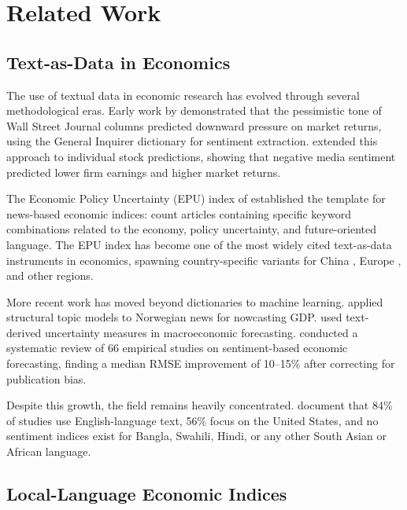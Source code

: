 
\section{Related Work}\label{sec:related}

\subsection{Text-as-Data in Economics}

The use of textual data in economic research has evolved through several methodological eras. Early work by \citet{tetlock2007giving} demonstrated that the pessimistic tone of Wall Street Journal columns predicted downward pressure on market returns, using the General Inquirer dictionary for sentiment extraction. \citet{tetlock2007sad} extended this approach to individual stock predictions, showing that negative media sentiment predicted lower firm earnings and higher market returns.

The Economic Policy Uncertainty (EPU) index of \citet{bakereconomic} established the template for news-based economic indices: count articles containing specific keyword combinations related to the economy, policy uncertainty, and future-oriented language. The EPU index has become one of the most widely cited text-as-data instruments in economics, spawning country-specific variants for China \citep{huang2018measuring}, Europe \citep{ferrara2022uncertainty}, and other regions.

More recent work has moved beyond dictionaries to machine learning. \citet{thorsrud2018text} applied structural topic models to Norwegian news for nowcasting GDP. \citet{jurado2015macroeconomic} used text-derived uncertainty measures in macroeconomic forecasting. \citet{nabil2026economic} conducted a systematic review of 66 empirical studies on sentiment-based economic forecasting, finding a median RMSE improvement of 10--15\% after correcting for publication bias.

Despite this growth, the field remains heavily concentrated. \citet{nabil2026economic} document that 84\% of studies use English-language text, 56\% focus on the United States, and no sentiment indices exist for Bangla, Swahili, Hindi, or any other South Asian or African language.

\subsection{Local-Language Economic Indices}

